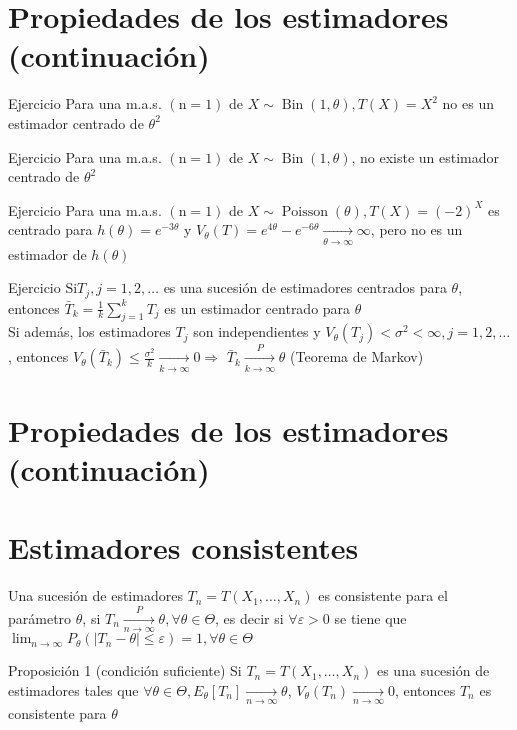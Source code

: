 \section*{Propiedades de los estimadores (continuación)}
Ejercicio Para una m.a.s. $(\mathrm{n}=1)$ de $X \sim \operatorname{Bin}(1, \theta), T(X)=X^{2}$ no es un estimador centrado de $\theta^{2}$

Ejercicio Para una m.a.s. $(\mathrm{n}=1)$ de $X \sim \operatorname{Bin}(1, \theta)$, no existe un estimador centrado de $\theta^{2}$

Ejercicio Para una m.a.s. $(\mathrm{n}=1)$ de $X \sim \operatorname{Poisson}(\theta), T(X)=(-2)^{X}$ es centrado para $h(\theta)=e^{-3 \theta}$ y $V_{\theta}(T)=e^{4 \theta}-e^{-6 \theta} \underset{\theta \rightarrow \infty}{\longrightarrow} \infty$, pero no es un estimador de $h(\theta)$

Ejercicio $\mathrm{Si} T_{j}, j=1,2, \ldots$ es una sucesión de estimadores centrados para $\theta$, entonces $\bar{T}_{k}=\frac{1}{k} \sum_{j=1}^{k} T_{j}$ es un estimador centrado para $\theta$\\
Si además, los estimadores $T_{j}$ son independientes y $V_{\theta}\left(T_{j}\right)<\sigma^{2}<\infty, j=1,2, \ldots$, entonces $V_{\theta}\left(\bar{T}_{k}\right) \leq \frac{\sigma^{2}}{k} \underset{k \rightarrow \infty}{\longrightarrow} 0 \Rightarrow$ $\bar{T}_{k} \xrightarrow[k \rightarrow \infty]{P} \theta$ (Teorema de Markov)

\section*{Propiedades de los estimadores (continuación)}
\section*{Estimadores consistentes}
Una sucesión de estimadores $T_{n}=T\left(X_{1}, \ldots, X_{n}\right)$ es consistente para el parámetro $\theta$, si $T_{n} \xrightarrow[n \rightarrow \infty]{P} \theta, \forall \theta \in \Theta$, es decir si $\forall \varepsilon>0$ se tiene que $\lim _{n \rightarrow \infty} P_{\theta}\left(\left|T_{n}-\theta\right| \leq \varepsilon\right)=1, \forall \theta \in \Theta$

Proposición 1 (condición suficiente) Si $T_{n}=T\left(X_{1}, \ldots, X_{n}\right)$ es una sucesión de estimadores tales que $\forall \theta \in \Theta, E_{\theta}\left[T_{n}\right] \underset{n \rightarrow \infty}{\longrightarrow} \theta$, $V_{\theta}\left(T_{n}\right) \underset{n \rightarrow \infty}{\longrightarrow} 0$, entonces $T_{n}$ es consistente para $\theta$

